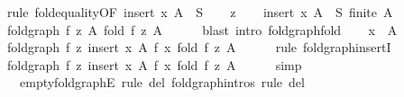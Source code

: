 \begin{isabellebody}
\ {\isacharparenleft}{\kern0pt}rule\ fold{\isacharunderscore}{\kern0pt}equality{\isacharbrackleft}{\kern0pt}OF\ {\isacartoucheopen}insert\ x\ A\ {\isasymsubseteq}\ S{\isacartoucheclose}{\isacharbrackright}{\kern0pt}{\isacharparenright}{\kern0pt}\isanewline
\ \ \isamarkupfalse%
\ z\isanewline
\ \ \isamarkupfalse%
\ {\isacartoucheopen}insert\ x\ A\ {\isasymsubseteq}\ S{\isacartoucheclose}\ {\isacartoucheopen}finite\ A{\isacartoucheclose}\ \isamarkupfalse%
\ {\isachardoublequoteopen}fold{\isacharunderscore}{\kern0pt}graph\ f\ z\ A\ {\isacharparenleft}{\kern0pt}fold\ f\ z\ A{\isacharparenright}{\kern0pt}{\isachardoublequoteclose}\isanewline
\ \ \ \ \isamarkupfalse%
\ {\isacharparenleft}{\kern0pt}blast\ intro{\isacharcolon}{\kern0pt}\ fold{\isacharunderscore}{\kern0pt}graph{\isacharunderscore}{\kern0pt}fold{\isacharparenright}{\kern0pt}\isanewline
\ \ \isamarkupfalse%
\ {\isacartoucheopen}x\ {\isasymnotin}\ A{\isacartoucheclose}\ \isamarkupfalse%
\ {\isachardoublequoteopen}fold{\isacharunderscore}{\kern0pt}graph\ f\ z\ {\isacharparenleft}{\kern0pt}insert\ x\ A{\isacharparenright}{\kern0pt}\ {\isacharparenleft}{\kern0pt}f\ x\ {\isacharparenleft}{\kern0pt}fold\ f\ z\ A{\isacharparenright}{\kern0pt}{\isacharparenright}{\kern0pt}{\isachardoublequoteclose}\isanewline
\ \ \ \ \isamarkupfalse%
\ {\isacharparenleft}{\kern0pt}rule\ fold{\isacharunderscore}{\kern0pt}graph{\isachardot}{\kern0pt}insertI{\isacharparenright}{\kern0pt}\isanewline
\ \ \isamarkupfalse%
\ \isamarkupfalse%
\ {\isachardoublequoteopen}fold{\isacharunderscore}{\kern0pt}graph\ f\ z\ {\isacharparenleft}{\kern0pt}insert\ x\ A{\isacharparenright}{\kern0pt}\ {\isacharparenleft}{\kern0pt}f\ x\ {\isacharparenleft}{\kern0pt}fold\ f\ z\ A{\isacharparenright}{\kern0pt}{\isacharparenright}{\kern0pt}{\isachardoublequoteclose}\isanewline
\ \ \ \ \isamarkupfalse%
\ simp\isanewline
{}\isamarkupfalse%
%
\endisatagproof
{\isafoldproof}%
%
\isadelimproof
\isanewline
%
\endisadelimproof
\isanewline
{}\isamarkupfalse%
\ {\isacharparenleft}{\kern0pt}\ {\isacharminus}{\kern0pt}{\isacharparenright}{\kern0pt}\ empty{\isacharunderscore}{\kern0pt}fold{\isacharunderscore}{\kern0pt}graphE\ {\isacharbrackleft}{\kern0pt}rule\ del{\isacharbrackright}{\kern0pt}\ fold{\isacharunderscore}{\kern0pt}graph{\isachardot}{\kern0pt}intros\ {\isacharbrackleft}{\kern0pt}rule\ del{\isacharbrackright}{\kern0pt}\isanewline
\ \ %
\end{isabellebody}
